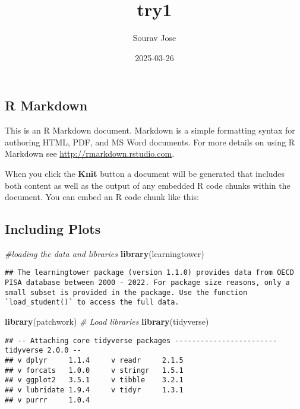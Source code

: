 \documentclass[
]{article}
\title{try1}
\author{Sourav Jose}
\date{2025-03-26}
\newenvironment{Shaded}{\begin{snugshade}}{\end{snugshade}}
\newcommand{\CommentTok}[1]{\textcolor[rgb]{0.56,0.35,0.01}{\textit{#1}}}
\newcommand{\FunctionTok}[1]{\textcolor[rgb]{0.13,0.29,0.53}{\textbf{#1}}}
\newcommand{\NormalTok}[1]{#1}
\begin{document}
\maketitle

\subsection{R Markdown}\label{r-markdown}

This is an R Markdown document. Markdown is a simple formatting syntax
for authoring HTML, PDF, and MS Word documents. For more details on
using R Markdown see \url{http://rmarkdown.rstudio.com}.

When you click the \textbf{Knit} button a document will be generated
that includes both content as well as the output of any embedded R code
chunks within the document. You can embed an R code chunk like this:

\subsection{Including Plots}\label{including-plots}

\begin{Shaded}
\begin{Highlighting}[]
\CommentTok{\#loading the data and libraries }
\FunctionTok{library}\NormalTok{(learningtower)}
\end{Highlighting}
\end{Shaded}

\begin{verbatim}
## The learningtower package (version 1.1.0) provides data from OECD PISA database between 2000 - 2022. For package size reasons, only a small subset is provided in the package. Use the function `load_student()` to access the full data.
\end{verbatim}

\begin{Shaded}
\begin{Highlighting}[]
\FunctionTok{library}\NormalTok{(patchwork)}
\CommentTok{\# Load libraries}
\FunctionTok{library}\NormalTok{(tidyverse)}
\end{Highlighting}
\end{Shaded}

\begin{verbatim}
## -- Attaching core tidyverse packages ------------------------ tidyverse 2.0.0 --
## v dplyr     1.1.4     v readr     2.1.5
## v forcats   1.0.0     v stringr   1.5.1
## v ggplot2   3.5.1     v tibble    3.2.1
## v lubridate 1.9.4     v tidyr     1.3.1
## v purrr     1.0.4
\end{verbatim}
\end{document}
